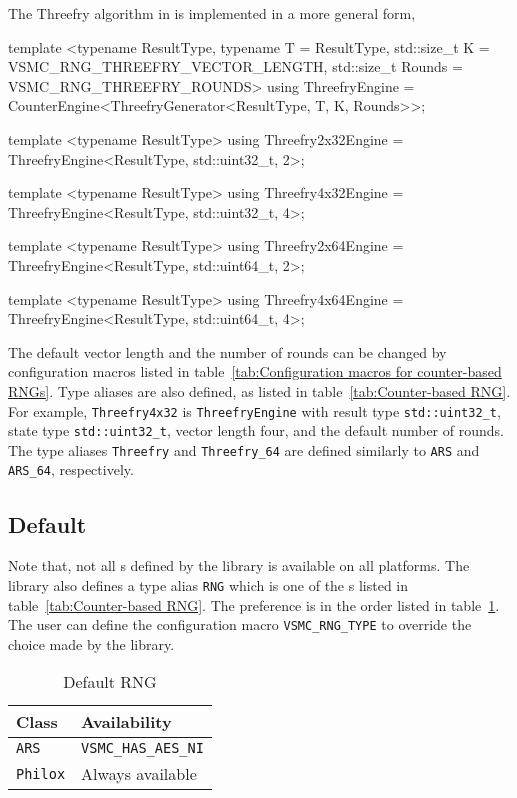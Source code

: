 The Threefry algorithm in \textcite{Salmon:2011um} is implemented in a more
general form,
\begin{cppcode}
  template <typename ResultType, typename T = ResultType,
      std::size_t K = VSMC_RNG_THREEFRY_VECTOR_LENGTH,
      std::size_t Rounds = VSMC_RNG_THREEFRY_ROUNDS>
  using ThreefryEngine =
      CounterEngine<ThreefryGenerator<ResultType, T, K, Rounds>>;

  template <typename ResultType>
  using Threefry2x32Engine = ThreefryEngine<ResultType, std::uint32_t, 2>;
  
  template <typename ResultType>
  using Threefry4x32Engine = ThreefryEngine<ResultType, std::uint32_t, 4>;
  
  template <typename ResultType>
  using Threefry2x64Engine = ThreefryEngine<ResultType, std::uint64_t, 2>;
  
  template <typename ResultType>
  using Threefry4x64Engine = ThreefryEngine<ResultType, std::uint64_t, 4>;
\end{cppcode}
The default vector length and the number of rounds can be changed by
configuration macros listed in table~\ref{tab:Configuration macros for
  counter-based RNGs}. Type aliases are also defined, as listed in
table~\ref{tab:Counter-based RNG}. For example, \verb|Threefry4x32| is
\verb|ThreefryEngine| with result type \verb|std::uint32_t|, state type
\verb|std::uint32_t|, vector length four, and the default number of rounds. The
type aliases \verb|Threefry| and \verb|Threefry_64| are defined similarly to
\verb|ARS| and \verb|ARS_64|, respectively.

\subsection{Default \protect\rng}
\label{sub:Default RNG}

Note that, not all \rng{}s defined by the library is available on all
platforms. The library also defines a type alias \verb|RNG| which is one of the
\rng{}s listed in table~\ref{tab:Counter-based RNG}. The preference is in the
order listed in table~\ref{tab:Default RNG}. The user can define the
configuration macro \verb|VSMC_RNG_TYPE| to override the choice made by the
library.

\begin{table}
  \begin{tabularx}{\textwidth}{XX}
    \toprule
    Class & Availability \\
    \midrule
    \verb|ARS|    & \verb|VSMC_HAS_AES_NI| \\
    \verb|Philox| & Always available       \\
    \bottomrule
  \end{tabularx}
  \caption{Default RNG}
  \label{tab:Default RNG}
\end{table}

